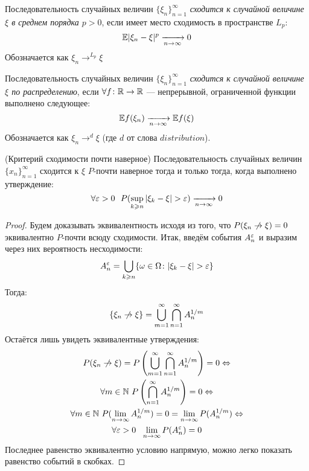 \begin{definition}
	Последовательность случайных величин $\{\xi_n\}_{n = 1}^\infty$ \textit{сходится к случайной величине $\xi$ в среднем порядка $p > 0$}, если имеет место сходимость в пространстве $L_p$:
	\[
		\mathbb{E}|\xi_n - \xi|^p \xrightarrow[n \to \infty]{} 0
	\]
	Обозначается как $\xi_n \to^{L_p} \xi$
\end{definition}

\begin{definition}
	Последовательность случайных величин $\{\xi_n\}_{n = 1}^\infty$ \textit{сходится к случайной величине $\xi$ по распределению}, если $\forall f \colon \mathbb{R} \to \mathbb{R}$ --- непрерывной, ограниченной функции выполнено следующее:
	\[
		\mathbb{E} f(\xi_n) \xrightarrow[n \to \infty]{
		} \mathbb{E} f(\xi)
	\]
	Обозначается как $\xi_n \to^d \xi$ (где $d$ от слова $distribution$).
\end{definition}

\begin{theorem} (Критерий сходимости почти наверное)
	Последовательность случайных величин $\{x_n\}_{n = 1}^\infty$ сходится к $\xi$ $P$-почти наверное тогда и только тогда, когда выполнено утверждение:
	\[
		\forall \varepsilon > 0\ \ P(\sup_{k \geqslant n} |\xi_k - \xi| > \varepsilon) \xrightarrow[n \to \infty]{} 0
	\]
\end{theorem}

\begin{proof}
	Будем доказывать эквивалентность исходя из того, что $P(\xi_n \centernot\to \xi) = 0$ эквивалентно $P$-почти всюду сходимости. Итак, введём события $A_n^{\varepsilon}$ и выразим через них вероятность несходимости:
	\[
		A_n^{\varepsilon} = \bigcup_{k \geqslant n} \{\omega \in \Omega \colon |\xi_k - \xi| > \varepsilon\}
	\]
	Тогда:
	\[
		\{\xi_n \centernot\to \xi\} = \bigcup_{m = 1}^\infty \bigcap_{n = 1}^\infty A_n^{1 / m}
	\]
	Остаётся лишь увидеть эквивалентные утверждения:
	\begin{multline*}
		P(\xi_n \centernot\to \xi) = P\ps{\bigcup_{m = 1}^\infty \bigcap_{n = 1}^\infty A_n^{1 / m}} = 0 \Lra
		\\
		\forall m \in \N\  P\ps{\bigcap_{n = 1}^\infty A_n^{1 / m}} = 0 \Lra
		\\
		\forall m \in \N\ P(\lim_{n \to \infty} A_n^{1 / m}) = 0 = \lim_{n \to \infty} P(A_n^{1 / m}) \Lra
		\\
		\forall \eps > 0\ \ \lim_{n \to \infty} P(A_n^\eps) = 0
	\end{multline*}
	Последнее равенство эквивалентно условию напрямую, можно легко показать равенство событий в скобках.
\end{proof}

